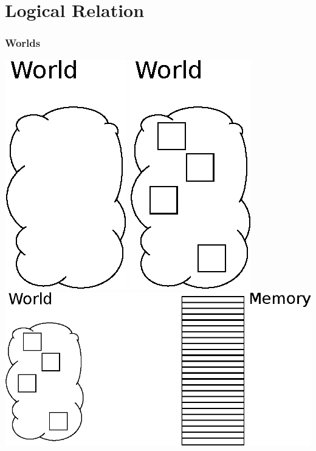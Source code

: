 \documentclass{beamer}
\begin{document}
\section{Logical Relation}
\begin{frame}
  \frametitle{Worlds}
  \begin{overprint}
    \includegraphics{World1.eps}
    \includegraphics{World2.eps}
    \includegraphics{World3.eps}

\end{overprint}
\end{frame}
\end{document}
